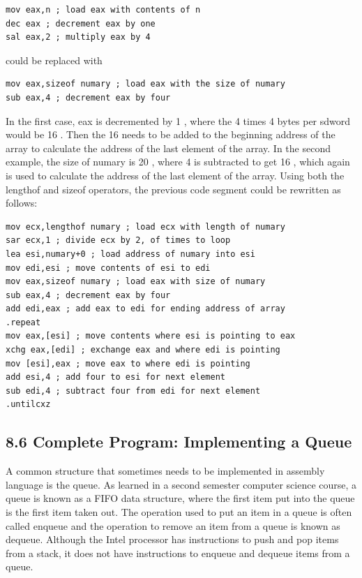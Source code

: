 \documentclass[10pt]{article}
\begin{document}
\begin{verbatim}
mov eax,n ; load eax with contents of n
dec eax ; decrement eax by one
sal eax,2 ; multiply eax by 4
\end{verbatim}

could be replaced with

\begin{verbatim}
mov eax,sizeof numary ; load eax with the size of numary
sub eax,4 ; decrement eax by four
\end{verbatim}

In the first case, eax is decremented by 1 , where the 4 times 4 bytes per sdword would be 16 . Then the 16 needs to be added to the beginning address of the array to calculate the address of the last element of the array. In the second example, the size of numary is 20 , where 4 is subtracted to get 16 , which again is used to calculate the address of the last element of the array. Using both the lengthof and sizeof operators, the previous code segment could be rewritten as follows:

\begin{verbatim}
mov ecx,lengthof numary ; load ecx with length of numary
sar ecx,1 ; divide ecx by 2, of times to loop
lea esi,numary+0 ; load address of numary into esi
mov edi,esi ; move contents of esi to edi
mov eax,sizeof numary ; load eax with size of numary
sub eax,4 ; decrement eax by four
add edi,eax ; add eax to edi for ending address of array
.repeat
mov eax,[esi] ; move contents where esi is pointing to eax
xchg eax,[edi] ; exchange eax and where edi is pointing
mov [esi],eax ; move eax to where edi is pointing
add esi,4 ; add four to esi for next element
sub edi,4 ; subtract four from edi for next element
.untilcxz
\end{verbatim}

\subsection*{8.6 Complete Program: Implementing a Queue}
A common structure that sometimes needs to be implemented in assembly language is the queue. As learned in a second semester computer science course, a queue is known as a FIFO data structure, where the first item put into the queue is the first item taken out. The operation used to put an item in a queue is often called enqueue and the operation to remove an item from a queue is known as dequeue. Although the Intel processor has instructions to push and pop items from a stack, it does not have instructions to enqueue and dequeue items from a queue.
\end{document}

